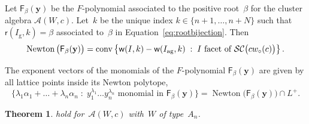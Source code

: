 \documentclass[10pt]{amsart}
\newtheorem{theo}{Theorem}[section]
\theoremstyle{definition}\newtheorem{rema}[theo]{Remark}\newtheorem{exem}[theo]{Example}
\DeclareMathOperator{\conv}{conv}
\newcommand{\y}{\mathbf{y}}
\newcommand{\Alg}{\mathcal{A}}
\newcommand{\subwordComplex}{\mathcal{SC}}
\newcommand{\clusterComplex}{\subwordComplex\big(\cw{c}\big)}
\newcommand{\greedy}{I_{\operatorname{g}}}
\newcommand{\antigreedy}{I_{\operatorname{ag}}}
\newcommand{\Fpoly}[2]{{\mathsf{F}_{#1}(#2)}}
\newcommand{\sq}[1]{{\rm #1}}
\newcommand{\sfr}{\mathsf{r}}
\newcommand{\sfw}{\mathsf{w}}
\newcommand{\wo}{{w_\circ}}
\newcommand{\sw}[2]{\sq{#1}(\sq{#2})}
\newcommand{\cwo}[1]{\sw{\wo}{#1}}
\newcommand{\cw}[1]{\sq{#1}\cwo{#1}}
\newcommand{\Root}[2]{{\sfr}(#1,#2)}
\newcommand{\Weight}[2]{{\sfw}(#1,#2)}
\newcommand{\Newton}[1]{{\operatorname{Newton}\big(#1 \big)}}
\newcommand{\set}[2]{\left\{ #1 \;:\; #2 \right\}}
\newcommand{\bigset}[2]{\big\{ #1 \;:\; #2 \big\}}
\begin{document}
\setcounter{theo}{11}
\begin{conj}\label{conj:newtonpolytope}
Let $\Fpoly{\beta}{\y}$ be the $F$-polynomial associated to the positive root~$\beta$ for the cluster algebra $\Alg(W,c)$. Let~$k$ be the unique index $k \in \{n+1,\dots,n+N\}$ such that $\Root{\greedy}{k} = \beta$ associated to~$\beta$ in Equation~\eqref{eq:rootbijection}. Then
\[
\Newton{\Fpoly{\beta}{\y}} = \conv\set{\Weight{I}{k} - \Weight{\antigreedy}{k}}{I \text{ facet of }\clusterComplex}.
\]
\end{conj}
\begin{conj}\label{conj:latticepoints}
The exponent vectors of the monomials of the $F$-polynomial $\Fpoly{\beta}{\y}$ are given by all lattice points inside its Newton polytope,
\[
\bigset{\lambda_1 \alpha_1+\dots+\lambda_n\alpha_n}{y_1^{\lambda_1}\dots y_n^{\lambda_n}\text{ monomial in }\Fpoly{\beta}{\y}} = \Newton{\Fpoly{\beta}{\y}} \cap L^+.
\]
\end{conj}
\begin{theo}\label{thm:main1}
 hold for~$\Alg(W,c)$ with~$W$ of type~$A_n$.
\end{theo}
\end{document}
